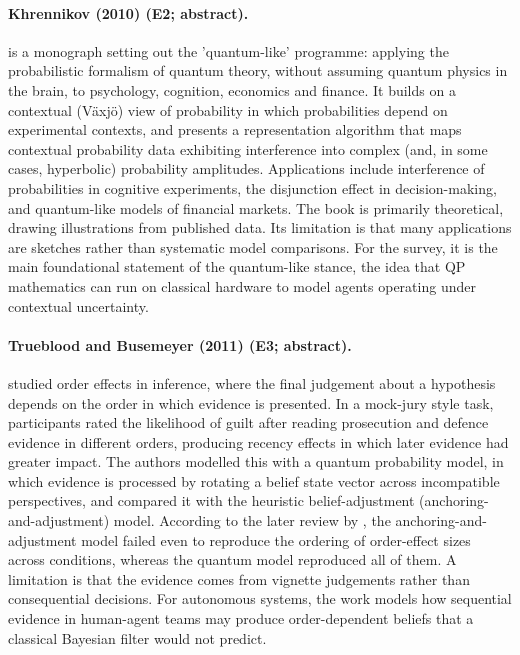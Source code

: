 \documentclass[10pt,a4paper]{article}
\begin{document}
\paragraph{Khrennikov (2010) (E2; abstract).} \citet{Khrennikov2010} is a monograph setting out the 'quantum-like' programme: applying the probabilistic formalism of quantum theory, without assuming quantum physics in the brain, to psychology, cognition, economics and finance. It builds on a contextual (Växjö) view of probability in which probabilities depend on experimental contexts, and presents a representation algorithm that maps contextual probability data exhibiting interference into complex (and, in some cases, hyperbolic) probability amplitudes. Applications include interference of probabilities in cognitive experiments, the disjunction effect in decision-making, and quantum-like models of financial markets. The book is primarily theoretical, drawing illustrations from published data. Its limitation is that many applications are sketches rather than systematic model comparisons. For the survey, it is the main foundational statement of the quantum-like stance, the idea that QP mathematics can run on classical hardware to model agents operating under contextual uncertainty.

\paragraph{Trueblood and Busemeyer (2011) (E3; abstract).} \citet{Trueblood2011} studied order effects in inference, where the final judgement about a hypothesis depends on the order in which evidence is presented. In a mock-jury style task, participants rated the likelihood of guilt after reading prosecution and defence evidence in different orders, producing recency effects in which later evidence had greater impact. The authors modelled this with a quantum probability model, in which evidence is processed by rotating a belief state vector across incompatible perspectives, and compared it with the heuristic belief-adjustment (anchoring-and-adjustment) model. According to the later review by \citep{Bruza2015}, the anchoring-and-adjustment model failed even to reproduce the ordering of order-effect sizes across conditions, whereas the quantum model reproduced all of them. A limitation is that the evidence comes from vignette judgements rather than consequential decisions. For autonomous systems, the work models how sequential evidence in human-agent teams may produce order-dependent beliefs that a classical Bayesian filter would not predict.
\end{document}

